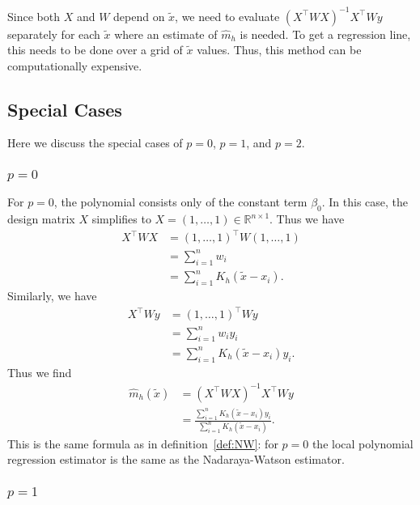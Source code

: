 \documentclass[
  a4paper,
]{article}
\theoremstyle{definition}
\theoremstyle{definition}
\theoremstyle{definition}
\theoremstyle{definition}
\theoremstyle{remark}
\begin{document}
Since both \(X\) and \(W\) depend on \(\tilde x\), we need to evaluate
\((X^\top W X)^{-1} X^\top W y\) separately for each \(\tilde x\) where
an estimate of \(\hat m_h\) is needed. To get a regression line, this needs
to be done over a grid of \(\tilde x\) values. Thus, this method can
be computationally expensive.

\hypertarget{special-cases}{%
\subsection{Special Cases}\label{special-cases}}

Here we discuss the special cases of \(p=0\), \(p=1\), and \(p=2\).

\hypertarget{p-0}{%
\subsubsection*{\texorpdfstring{\(p = 0\)}{p = 0}}\label{p-0}}

For \(p=0\), the polynomial consists only of the constant term \(\beta_0\).
In this case, the design matrix \(X\) simplifies to \(X = (1, \ldots, 1) \in \mathbb{R}^{n\times 1}\). Thus we have
\begin{align*}
  X^\top W X
  &= (1, \ldots, 1)^\top W (1, \ldots, 1) \\
  &= \sum_{i=1}^n w_i \\
  &= \sum_{i=1}^n K_h(\tilde x - x_i).
\end{align*}
Similarly, we have
\begin{align*}
  X^\top W y
  &= (1, \ldots, 1)^\top W y \\
  &= \sum_{i=1}^n w_i y_i \\
  &= \sum_{i=1}^n K_h(\tilde x - x_i) y_i.
\end{align*}
Thus we find
\begin{align*}
  \hat m_h(\tilde x)
  &= (X^\top W X)^{-1} X^\top W y \\
  &= \frac{\sum_{i=1}^n K_h(\tilde x - x_i) y_i}{\sum_{i=1}^n K_h(\tilde x - x_i)}.
\end{align*}
This is the same formula as in definition~\ref{def:NW}: for \(p=0\)
the local polynomial regression estimator is the same as the Nadaraya-Watson
estimator.

\hypertarget{p-1}{%
\subsubsection*{\texorpdfstring{\(p = 1\)}{p = 1}}\label{p-1}}
\end{document}
